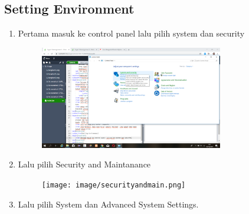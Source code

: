 \documentclass{article}
\begin{document}
\subsection{Setting Environment}
\begin{enumerate}
    \item Pertama masuk ke control panel lalu pilih system dan security
        \begin{figure}[h]
            \centerline{\includegraphics[width=8cm]{image/cpanel.png}}
        \end{figure}
    \item Lalu pilih Security and Maintanance
        \begin{figure}[h]
            \centerline{\texttt{[image: image/securityandmain.png]}}
        \end{figure}
    \item Lalu pilih System dan Advanced System Settings.

\end{enumerate}
\end{document}
